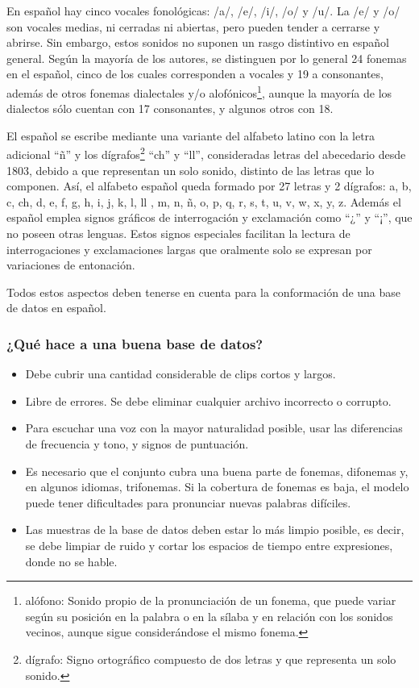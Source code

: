 En español hay cinco vocales fonológicas: /a/, /e/, /i/, /o/ y /u/. La /e/ y /o/ son vocales medias, ni cerradas ni abiertas, pero pueden tender a cerrarse y abrirse. Sin embargo, estos sonidos no suponen un rasgo distintivo en español general. Según la mayoría de los autores, se distinguen por lo general 24 fonemas en el español, cinco de los cuales corresponden a vocales y 19 a consonantes, además de otros fonemas dialectales y/o alofónicos\footnote{alófono: Sonido propio de la pronunciación de un fonema, que puede variar según su posición en la palabra o en la sílaba y en relación con los sonidos vecinos, aunque sigue considerándose el mismo fonema.}, aunque la mayoría de los dialectos sólo cuentan con 17 consonantes, y algunos otros con 18.

El español se escribe mediante una variante del alfabeto latino con la letra adicional ``ñ'' y los dígrafos\footnote{dígrafo: Signo ortográfico compuesto de dos letras y que representa un solo sonido.} ``ch'' y ``ll'', consideradas letras del abecedario desde 1803, debido a que representan un solo sonido, distinto de las letras que lo componen. Así, el alfabeto español queda formado por 27 letras y 2 dígrafos: a, b, c, ch, d, e, f, g, h, i, j, k, l, ll , m, n, ñ, o, p, q, r, s, t, u, v, w, x, y, z. Además el español emplea signos gráficos de interrogación y exclamación como ``¿'' y ``¡'', que no poseen otras lenguas. Estos signos especiales facilitan la lectura de interrogaciones y exclamaciones largas que oralmente solo se expresan por variaciones de entonación. 

Todos estos aspectos deben tenerse en cuenta para la conformación de una base de datos en español.

\subsubsection{¿Qué hace a una buena base de datos?}

\begin{itemize}
	\item Debe cubrir una cantidad considerable de clips cortos y largos.
	\item Libre de errores. Se debe eliminar cualquier archivo incorrecto o corrupto. 
	\item Para escuchar una voz con la mayor naturalidad posible, usar las diferencias de frecuencia y tono, y signos de puntuación.
	\item Es necesario que el conjunto cubra una buena parte de fonemas, difonemas y, en algunos idiomas, trifonemas. Si la cobertura de fonemas es baja, el modelo puede tener dificultades para pronunciar nuevas palabras difíciles.
	\item Las muestras de la base de datos deben estar lo más limpio posible, es decir, se debe limpiar de ruido y cortar los espacios de tiempo entre expresiones, donde no se hable.
	
\end{itemize}

